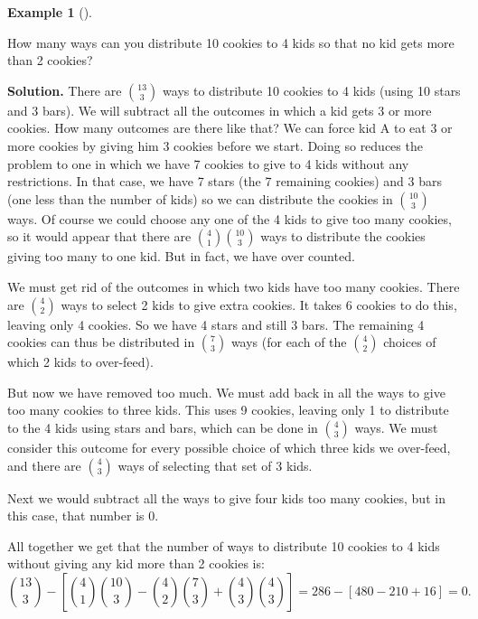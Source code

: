 \documentclass[10pt,]{book}
\theoremstyle{plain}
\theoremstyle{definition}
\newtheorem{example}[theorem]{Example}
\theoremstyle{definition}
\theoremstyle{definition}
\numberwithin{equation}{section}
\begin{document}
\begin{example}[]\label{example-47}

          How many ways can you distribute 10 cookies to 4 kids so that no kid gets more than 2 cookies?
\par\medskip\noindent%
\textbf{Solution.}\quad 
          There are \({13 \choose 3}\) ways to distribute 10 cookies to 4 kids (using 10 stars and 3 bars).  We will subtract all the outcomes in which a kid gets 3 or more cookies. How many outcomes are there like that? We can force kid A to eat 3 or more cookies by giving him 3 cookies before we start. Doing so reduces the problem to one in which we have 7 cookies to give to 4 kids without any restrictions. In that case, we have 7 stars (the 7 remaining cookies) and 3 bars (one less than the number of kids) so we can distribute the cookies in
          \({10 \choose 3}\) ways. Of course we could choose any one of the 4 kids to give too many cookies, so it would appear that there are \({4 \choose 1}{10 \choose 3}\) ways to distribute the cookies giving too many to one kid. But in fact, we have over counted.
\par

          We must get rid of the outcomes in which two kids have too many cookies. There are \({4 \choose 2}\) ways to select 2 kids to give extra cookies. It takes 6 cookies to do this, leaving only 4 cookies. So we have 4 stars and still 3 bars. The remaining 4 cookies can thus be distributed in \({7 \choose 3}\) ways (for each of the \({4 \choose 2}\) choices of which 2 kids to over-feed).
\par

          But now we have removed too much. We must add back in all the ways to give too many cookies to three kids. This uses 9 cookies, leaving only 1 to distribute to the 4 kids using stars and bars, which can be done in \({4 \choose 3}\) ways. We must consider this outcome for every possible choice of which three kids we over-feed, and there are \({4 \choose 3}\) ways of selecting that set of 3 kids.
\par

          Next we would subtract all the ways to give four kids too many cookies, but in this case, that number is 0.
\par

          All together we get that the number of ways to distribute 10 cookies to 4 kids without giving any kid more than 2 cookies is:
          \begin{equation*}
            {13 \choose 3} - \left[{4 \choose 1}{10 \choose 3} - {4 \choose 2}{7 \choose 3} + {4\choose 3}{4\choose 3}\right] = 286 - [480 - 210 + 16] = 0.
          \end{equation*}
\par


\end{example}
\end{document}

